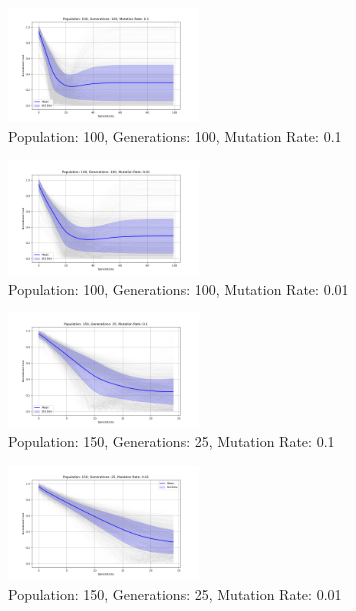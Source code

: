 \documentclass[
]{article}
\begin{document}
    \begin{figure}[H]
        \centering
        \includegraphics[width=0.45\textwidth]{genetic_algorithm/appendix/Population_100_Generations_100_MutationRate_0.1}
        \caption{Population: 100, Generations: 100, Mutation Rate: 0.1}
        \label{fig:app_ga_100_100_1}
    \end{figure}

    \begin{figure}[H]
        \centering
        \includegraphics[width=0.45\textwidth]{genetic_algorithm/appendix/Population_100_Generations_100_MutationRate_0.01}
        \caption{Population: 100, Generations: 100, Mutation Rate: 0.01}
        \label{fig:app_ga_100_100_01}
    \end{figure}

    \begin{figure}[H]
        \centering
        \includegraphics[width=0.45\textwidth]{genetic_algorithm/appendix/Population_150_Generations_25_MutationRate_0.1}
        \caption{Population: 150, Generations: 25, Mutation Rate: 0.1}
        \label{fig:app_ga_150_25_1}
    \end{figure}

    \begin{figure}[H]
        \centering
        \includegraphics[width=0.45\textwidth]{genetic_algorithm/appendix/Population_150_Generations_25_MutationRate_0.01}
        \caption{Population: 150, Generations: 25, Mutation Rate: 0.01}
        \label{fig:app_ga_150_25_01}
    \end{figure}
\end{document}
